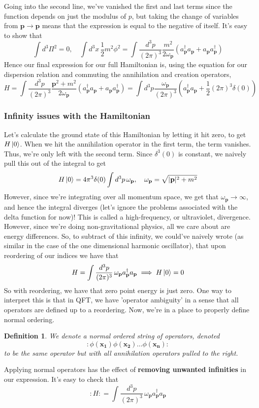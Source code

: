 \documentclass[11pt, oneside]{article}   	%
\theoremstyle{newline}
\theoremstyle{newline}
\theoremstyle{newline}
\theoremstyle{newline}
\theoremstyle{newline}
\newtheorem*{defn}{Definition}
\newcommand{\intp}{ \int \frac{ d^3 p }{ (2 \pi)^3 } \, }
\newcommand{\ann}[1]{a_{ \mathbf{ #1 }}}
\newcommand{\crea}[1]{a^\dagger_{ \mathbf{ #1 }}}
\newcommand{\ve}[1]{ \mathbf{ #1 } }
\newcommand{\freq}[1]{\omega_\mathbf{ #1} }
\newcommand{\scal}[1]{\phi ( \mathbf{ #1 })}
\begin{document}
Going into the second line, we've vanished the first and last terms since the function depends on just the modulus of $p$, but taking the change of variables from $\mathbf{ p} \rightarrow \ve{p} $ means that the expression is equal to the negative of itself. It's easy to show that 
\[\int d^3 \Pi^2  = 0, \quad \int d^3  x \, \frac{ 1}{ 2} m^2 \phi^2 =  \int \frac{d^3 p}{(2 \pi)^3 } \frac{ m^2}{ 2 \freq{ p } }  \left( a_{\mathbf{p}}^\dagger a_{\mathbf{p}} + a_\mathbf{p} a_\mathbf{p}^\dagger \right)  \]
Hence our final expression for our full Hamiltonian is, using the equation for our dispersion relation and commuting the annihilation and creation operators, 
\[
H =  \int \frac{d^3 p}{(2 \pi)^3 } \frac{ \mathbf{p}^2 + m^2 }{ 2 \freq{ p } }  \left( a_{\mathbf{p}}^\dagger a_{\mathbf{p}} + a_\mathbf{p} a_\mathbf{p}^\dagger \right) = \int d^3 p \frac{\omega_\mathbf{p}}{(2 \pi)^3 } \left( a_\mathbf{p}^\dagger a_\mathbf{p} + \frac{1}{2}(2 \pi )^3 \delta (0) \right)
\] 

\subsubsection{Infinity issues with the Hamiltonian} 
Let's calculate the ground state of this Hamiltonian by letting it hit zero, to get $H \ket{ 0 } $. When we hit the annihilation operator in the first term, the term vanishes. Thus, we're only left with the second term. Since $\delta^ 3 ( 0 ) $ is constant, we naively pull this out of the integral to get 
\[ 
H \ket{0 }  = 4 \pi^3 \delta ( 0 ) \int d^3 p\,  \freq{p }, \quad \freq{ p }  = \sqrt{ | \mathbf{ p } |^2 + m^2 }
\] 
However, since we're integrating over all momentum space, we get that $\freq{p} \rightarrow \infty $, and hence the integral diverges (let's ignore the problems associated with the delta function for now)! This is called a high-frequency, or ultraviolet, divergence. However, since we're doing non-gravitational physics, all we care about are energy differences. So, to subtract of this infinity, we could've naively wrote (as similar in the case of the one dimensional harmonic oscillator), that upon reordering of our indices we have that 
\[ 
H = \intp \freq{p } \crea{p} \ann{p} \implies H \ket{ 0 } = 0 
\] So with reordering, we have that zero point energy is just zero. One way to interpret this is that in QFT, we have 'operator ambiguity' in a sense that all operators are defined up to a reordering. Now, we're in a place to properly define normal ordering. 

\begin{defn} 
We denote a normal ordered string of operators, denoted 
\[ 
: \scal{ x_1 } \scal{x_2 } \dots \scal{x_n} : 
\] to be the same operator but with all annihilation operators pulled to the right. 
\end{defn} 
Applying normal operators has the effect of \textbf{removing unwanted infinities} in our expression. It's easy to check that 
\[ 
: H :  =\intp \freq{p } \crea{p} \ann{ p } 
\] 
\end{document}
